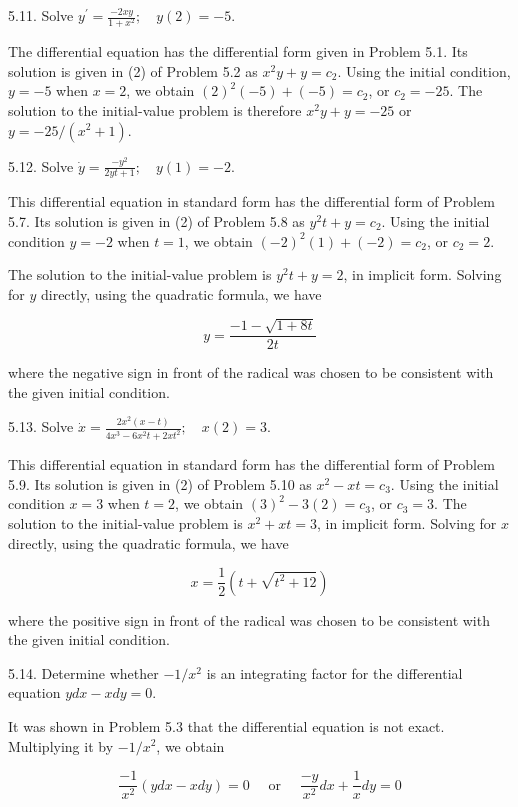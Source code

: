 \documentclass[10pt]{article}
\begin{document}
5.11. Solve $y^{\prime}=\frac{-2 x y}{1+x^{2}} ; \quad y(2)=-5$.

The differential equation has the differential form given in Problem 5.1. Its solution is given in (2) of Problem 5.2 as $x^{2} y+y=c_{2}$. Using the initial condition, $y=-5$ when $x=2$, we obtain $(2)^{2}(-5)+(-5)=c_{2}$, or $c_{2}=-25$. The solution to the initial-value problem is therefore $x^{2} y+y=-25$ or $y=-25 /\left(x^{2}+1\right)$.

5.12. Solve $\dot{y}=\frac{-y^{2}}{2 y t+1} ; \quad y(1)=-2$.

This differential equation in standard form has the differential form of Problem 5.7. Its solution is given in (2) of Problem 5.8 as $y^{2} t+y=c_{2}$. Using the initial condition $y=-2$ when $t=1$, we obtain $(-2)^{2}(1)+(-2)=c_{2}$, or $c_{2}=2$.

The solution to the initial-value problem is $y^{2} t+y=2$, in implicit form. Solving for $y$ directly, using the quadratic formula, we have

$$
y=\frac{-1-\sqrt{1+8 t}}{2 t}
$$

where the negative sign in front of the radical was chosen to be consistent with the given initial condition.

5.13. Solve $\dot{x}=\frac{2 x^{2}(x-t)}{4 x^{3}-6 x^{2} t+2 x t^{2}} ; \quad x(2)=3$.

This differential equation in standard form has the differential form of Problem 5.9. Its solution is given in (2) of Problem 5.10 as $x^{2}-x t=c_{3}$. Using the initial condition $x=3$ when $t=2$, we obtain $(3)^{2}-3(2)=c_{3}$, or $c_{3}=3$. The solution to the initial-value problem is $x^{2}+x t=3$, in implicit form. Solving for $x$ directly, using the quadratic formula, we have

$$
x=\frac{1}{2}\left(t+\sqrt{t^{2}+12}\right)
$$

where the positive sign in front of the radical was chosen to be consistent with the given initial condition.

5.14. Determine whether $-1 / x^{2}$ is an integrating factor for the differential equation $y d x-x d y=0$.

It was shown in Problem 5.3 that the differential equation is not exact. Multiplying it by $-1 / x^{2}$, we obtain


\begin{equation*}
\frac{-1}{x^{2}}(y d x-x d y)=0 \quad \text { or } \quad \frac{-y}{x^{2}} d x+\frac{1}{x} d y=0 \tag{1}
\end{equation*}
\end{document}

